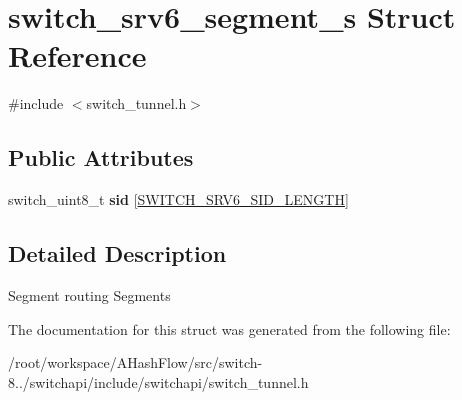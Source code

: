 \hypertarget{structswitch__srv6__segment__s}{\section{switch\+\_\+srv6\+\_\+segment\+\_\+s Struct Reference}
\label{structswitch__srv6__segment__s}
}


{\ttfamily \#include $<$switch\+\_\+tunnel.\+h$>$}

\subsection*{Public Attributes}
\begin{DoxyCompactItemize}
\item 
\hypertarget{group__Tunnel_ga13c6acc4575e1f194c05592e88b0d9bf}{switch\+\_\+uint8\+\_\+t {\bfseries sid} \mbox{[}\hyperlink{group__Tunnel_ga9d8eb6604f4c584e8bcd459e24868968}{S\+W\+I\+T\+C\+H\+\_\+\+S\+R\+V6\+\_\+\+S\+I\+D\+\_\+\+L\+E\+N\+G\+T\+H}\mbox{]}}\label{group__Tunnel_ga13c6acc4575e1f194c05592e88b0d9bf}

\end{DoxyCompactItemize}


\subsection{Detailed Description}
Segment routing Segments 

The documentation for this struct was generated from the following file\+:\begin{DoxyCompactItemize}
\item 
/root/workspace/\+A\+Hash\+Flow/src/switch-\/8../switchapi/include/switchapi/switch\+\_\+tunnel.\+h\end{DoxyCompactItemize}

